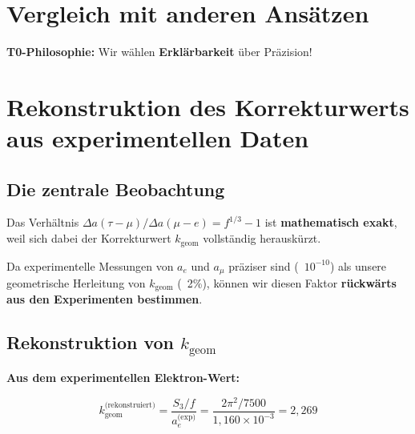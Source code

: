	\section{Vergleich mit anderen Ansätzen}
	
	\begin{table}[h]
		\centering
		\caption{Vergleich verschiedener Ansätze}
	\end{table}
	
	\textbf{T0-Philosophie:} Wir wählen \textbf{Erklärbarkeit} über Präzision!
	\section{Rekonstruktion des Korrekturwerts aus experimentellen Daten}
	
	\subsection{Die zentrale Beobachtung}
	
	Das Verhältnis $\Delta a(\tau-\mu) / \Delta a(\mu-e) = f^{1/3} - 1$ ist \textbf{mathematisch exakt}, weil sich dabei der Korrekturwert $k_{\text{geom}}$ vollständig herauskürzt.
	
	Da experimentelle Messungen von $a_e$ und $a_\mu$ präziser sind (~$10^{-10}$) als unsere geometrische Herleitung von $k_{\text{geom}}$ (~2\%), können wir diesen Faktor \textbf{rückwärts aus den Experimenten bestimmen}.
	
	\subsection{Rekonstruktion von $k_{\text{geom}}$}
	
	\textbf{Aus dem experimentellen Elektron-Wert:}
	
	\begin{equation}
		k_{\text{geom}}^{\text{(rekonstruiert)}} = \frac{S_3/f}{a_e^{\text{(exp)}}} = \frac{2\pi^2 / 7500}{1{,}160 \times 10^{-3}} = 2{,}269
	\end{equation}
	
